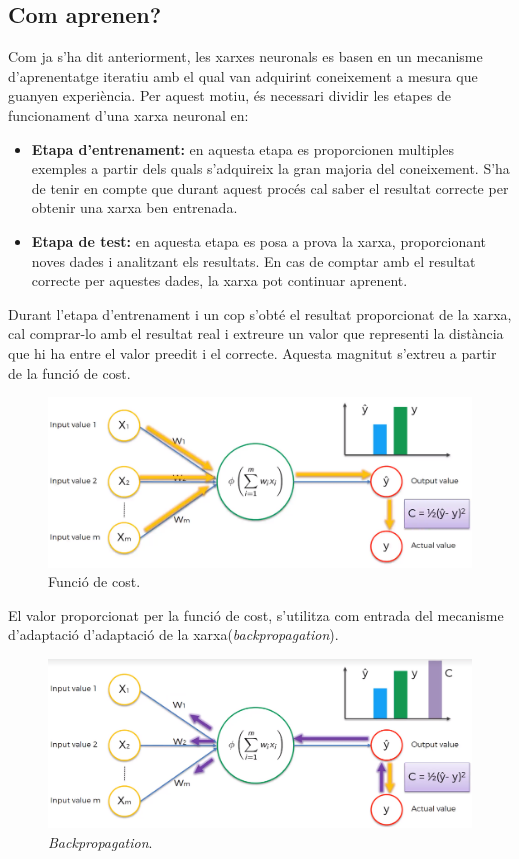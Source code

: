 \documentclass[12pt]{article}
\begin{document}
\subsection{Com aprenen?}
Com ja s'ha dit anteriorment, les xarxes neuronals es basen en un mecanisme d'aprenentatge iteratiu amb el qual van adquirint coneixement a mesura que guanyen experiència. Per aquest motiu, és necessari dividir les etapes de funcionament d'una xarxa neuronal en:
\begin{itemize}
	\item \textbf{Etapa d'entrenament:} en aquesta etapa es proporcionen multiples exemples a partir dels quals s'adquireix la gran majoria del coneixement. S'ha de tenir en compte que durant aquest procés cal saber el resultat correcte per obtenir una xarxa ben entrenada.
	\item \textbf{Etapa de test:} en aquesta etapa es posa a prova la xarxa, proporcionant noves dades i analitzant els resultats. En cas de comptar amb el resultat correcte per aquestes dades, la xarxa pot continuar aprenent.
\end{itemize}
Durant l'etapa d'entrenament i un cop s'obté el resultat proporcionat de la xarxa, cal comprar-lo amb el resultat real i extreure un valor que representi la distància que hi ha entre el valor preedit i el correcte. Aquesta magnitut s'extreu a partir de la funció de cost. 
\begin{figure}[h!]
	\centering
	\includegraphics[scale=0.3]{imatges/aprendre/1aprendre.png}
	\caption{Funció de cost.}
\end{figure}
El valor proporcionat per la funció de cost, s'utilitza com entrada del mecanisme d'adaptació d'adaptació de la xarxa(\textit{backpropagation}).
\begin{figure}[h!]
	\centering
	\includegraphics[scale=0.3]{imatges/aprendre/2bp.png}
	\caption{\textit{Backpropagation}.}
\end{figure}
\clearpage
\end{document}
